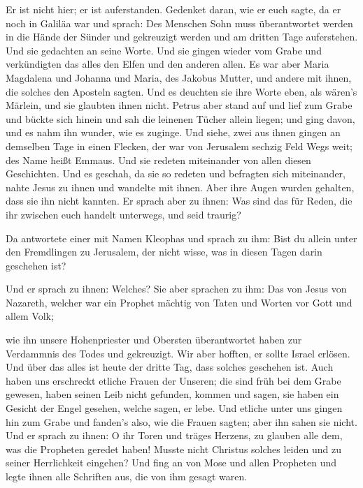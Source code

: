  Er ist nicht hier; er ist auferstanden. Gedenket daran,
wie er euch sagte, da er noch in Galiläa war  und sprach:
Des Menschen Sohn muss überantwortet werden in die Hände der Sünder und
gekreuzigt werden und am dritten Tage auferstehen.  Und
sie gedachten an seine Worte.  Und sie gingen wieder vom
Grabe und verkündigten das alles den Elfen und den anderen allen.
 Es war aber Maria Magdalena und Johanna und Maria, des
Jakobus Mutter, und andere mit ihnen, die solches den Aposteln sagten.
 Und es deuchten sie ihre Worte eben, als wären's
Märlein, und sie glaubten ihnen nicht.  Petrus aber stand
auf und lief zum Grabe und bückte sich hinein und sah die leinenen
Tücher allein liegen; und ging davon, und es nahm ihn wunder, wie es
zuginge.  Und siehe, zwei aus ihnen gingen an demselben
Tage in einen Flecken, der war von Jerusalem sechzig Feld Wegs weit; des
Name heißt Emmaus.  Und sie redeten miteinander von allen
diesen Geschichten.  Und es geschah, da sie so redeten
und befragten sich miteinander, nahte Jesus zu ihnen und wandelte mit
ihnen.  Aber ihre Augen wurden gehalten, dass sie ihn
nicht kannten.  Er sprach aber zu ihnen: Was sind das für
Reden, die ihr zwischen euch handelt unterwegs, und seid traurig?

 Da antwortete einer mit Namen Kleophas und sprach zu
ihm: Bist du allein unter den Fremdlingen zu Jerusalem, der nicht wisse,
was in diesen Tagen darin geschehen ist?

 Und er sprach zu ihnen: Welches? Sie aber sprachen zu
ihm: Das von Jesus von Nazareth, welcher war ein Prophet mächtig von
Taten und Worten vor Gott und allem Volk;

 wie ihn unsere Hohenpriester und Obersten überantwortet
haben zur Verdammnis des Todes und gekreuzigt.  Wir aber
hofften, er sollte Israel erlösen. Und über das alles ist heute der
dritte Tag, dass solches geschehen ist.  Auch haben uns
erschreckt etliche Frauen der Unseren; die sind früh bei dem Grabe
gewesen,  haben seinen Leib nicht gefunden, kommen und
sagen, sie haben ein Gesicht der Engel gesehen, welche sagen, er lebe.
 Und etliche unter uns gingen hin zum Grabe und fanden's
also, wie die Frauen sagten; aber ihn sahen sie nicht. 
Und er sprach zu ihnen: O ihr Toren und träges Herzens, zu glauben alle
dem, was die Propheten geredet haben!  Musste nicht
Christus solches leiden und zu seiner Herrlichkeit eingehen?
 Und fing an von Mose und allen Propheten und legte ihnen
alle Schriften aus, die von ihm gesagt waren.

